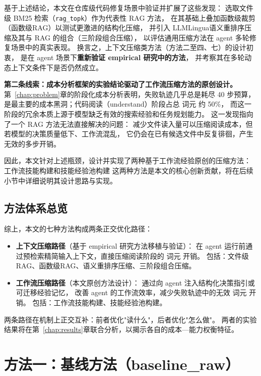基于上述结论，本文在仓库级代码修复场景中验证并扩展了这些发现：
选取文件级 BM25 检索（\texttt{rag\_topk}）作为代表性 RAG 方法，
在其基础上叠加函数级裁剪（函数级RAG）以测试更激进的结构化压缩，
并引入 LLMLingua语义重排序压缩及其与 RAG 的组合（三阶段组合压缩），
以评估通用压缩方法在 agent 多轮修复场景中的真实表现。
换言之，上下文压缩类方法（方法二至四、七）的设计初衷，
是在 agent 场景下\textbf{重新验证 empirical 研究中的方法}，
并考察其在多轮动态上下文条件下是否仍然成立。

\textbf{第二条线索：成本分析框架的实验结论驱动了工作流压缩方法的原创设计。}
第~\ref{chap:problem}章的阶段化成本分析表明，失败轨迹几乎总是耗尽 40 步预算，
是最主要的成本黑洞；代码阅读（understand）阶段占总 词元 约 50\%，
而这一阶段的冗余本质上源于模型缺乏有效的搜索经验和任务规划能力。
这一发现指向了一个 RAG 方法无法直接解决的问题：
减少文件读入量可以压缩阅读成本，但若模型的决策质量低下、工作流混乱，
它仍会在已有候选文件中反复徘徊，产生无效的多步开销。

因此，本文针对上述瓶颈，设计并实现了两种基于工作流经验原创的压缩方法：
工作流技能构建和技能经验池构建
这两种方法是本文的核心创新贡献，将在后续小节中详细说明其设计思路与实现。

\subsection{方法体系总览}
\label{subsec:method-overview}

综上，本文的七种方法构成两条正交优化路径：

\begin{itemize}
\item \textbf{上下文压缩路径}（基于 empirical 研究方法移植与验证）：
在 agent 运行前通过预检索精简输入上下文，直接压缩阅读阶段的 词元 开销。
包括：文件级RAG、函数级RAG、语义重排序压缩、三阶段组合压缩。
\item \textbf{工作流压缩路径}（本文原创方法设计）：
通过向 agent 注入结构化决策指引或可迁移经验记忆，
改善 agent 的工作流效率，减少失败轨迹中的无效 词元 开销。
包括：工作流技能构建、技能经验池构建。
\end{itemize}

两条路径在机制上正交互补：前者优化"读什么"，后者优化"怎么做"。
两者的实验结果将在第~\ref{chap:results}章联合分析，以揭示各自的成本—能力权衡特征。

\section{方法一：基线方法（baseline\_raw）}
\label{sec:baseline}

